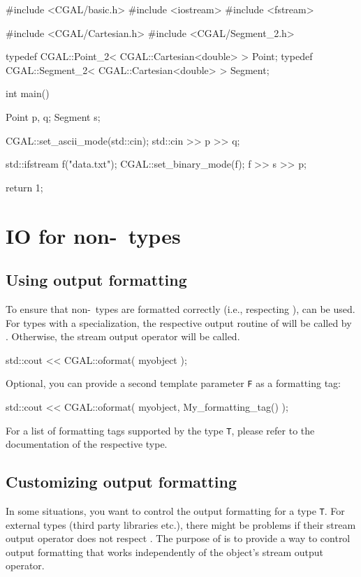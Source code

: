 \begin{ccExampleCode}

#include <CGAL/basic.h>
#include <iostream>
#include <fstream>

#include <CGAL/Cartesian.h>
#include <CGAL/Segment_2.h>

typedef CGAL::Point_2< CGAL::Cartesian<double> >     Point;
typedef CGAL::Segment_2< CGAL::Cartesian<double> >   Segment;

int
main()
{
    Point p, q;
    Segment s;

    CGAL::set_ascii_mode(std::cin);
    std::cin >> p >> q;

    std::ifstream f("data.txt");
    CGAL::set_binary_mode(f);
    f >> s >> p;

    return 1;
}
\end{ccExampleCode}

\section{IO for non-\cgal\ types\label{sec:iofornoncgaltypes}}


\subsection{Using output formatting}
To ensure that non-\cgal\ types are formatted correctly (i.e., respecting ),  can be used. For types with a  specialization, the respective output routine of  will be called by . Otherwise, the stream output operator will be called.

\ccExample
\begin{ccExampleCode}
std::cout << CGAL::oformat( myobject );
\end{ccExampleCode}

Optional, you can provide a second template parameter \texttt{F} as a formatting tag:

\ccExample
\begin{ccExampleCode}
std::cout << CGAL::oformat( myobject, My_formatting_tag() );
\end{ccExampleCode}

For a list of formatting tags supported by the type \texttt{T}, please refer to the documentation of the respective type.

\subsection{Customizing output formatting}
In some situations, you want to control the output formatting for a type \texttt{T}. For external types (third party libraries etc.), there might be problems if their stream output operator does not respect . The purpose of  is to provide a way to control output formatting that works independently of the object's stream output operator.

